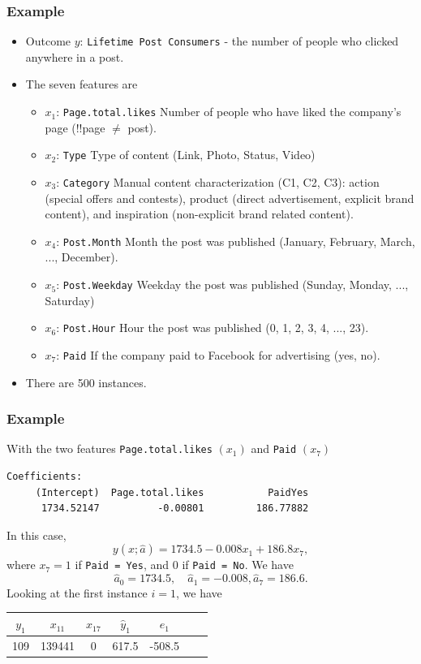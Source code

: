\begin{frame}
\frametitle{Example}
\begin{itemize}
\item Outcome $y$: {\tt Lifetime Post Consumers} - the number of people who clicked anywhere in a post.
\item The seven features are 
\begin{itemize}
\scriptsize
\item $x_1$: {\tt Page.total.likes} Number of people who have liked the company's page (!!page $\neq$ post).
\item $x_2$: {\tt Type} Type of content (Link, Photo, Status, Video)
\item $x_3$: {\tt Category} Manual content characterization (C1, C2, C3): action (special offers and
contests), product (direct advertisement, explicit brand content), and inspiration (non-explicit brand related content).
\item $x_4$: {\tt Post.Month} Month the post was published (January, February, March, ...,
December).
\item $x_5$: {\tt Post.Weekday} Weekday the post was published (Sunday, Monday, ...,
Saturday)
\item $x_6$: {\tt Post.Hour} Hour the post was published (0, 1, 2, 3, 4, ..., 23).
\item $x_7$: {\tt Paid} If the company paid to Facebook for advertising (yes, no).
\end{itemize}
\item There are 500 instances.
\end{itemize}
\end{frame}
\begin{frame}[fragile]
\frametitle{Example}
With the two features {\tt Page.total.likes} $(x_1)$ and {\tt Paid} $(x_7)$\\ 
\scriptsize
\begin{verbatim}
Coefficients:
     (Intercept)  Page.total.likes           PaidYes  
      1734.52147          -0.00801         186.77882   
\end{verbatim}
\normalsize
In this case,
$$
y(x;\hat{a}) = 1734.5 - 0.008 x_1 + 186.8 x_7,
$$
where $x_7 = 1$ if {\tt Paid = Yes}, and 0 if {\tt Paid = No}. We have
$$
\hat{a}_0 = 1734.5, \quad \hat{a}_1=-0.008, \hat{a}_7=186.6.
$$
Looking at the first instance $i=1$, we have
\begin{center}
\begin{tabular}{|c|c|c|c|c|c|c|}
\hline
$y_1$ & $x_{11}$ & $x_{17}$ & $\hat{y}_1$ & $e_1$\\
\hline
109 & 139441 & 0 & 617.5 & -508.5\\
\hline
\end{tabular}
\end{center}
\end{frame}
